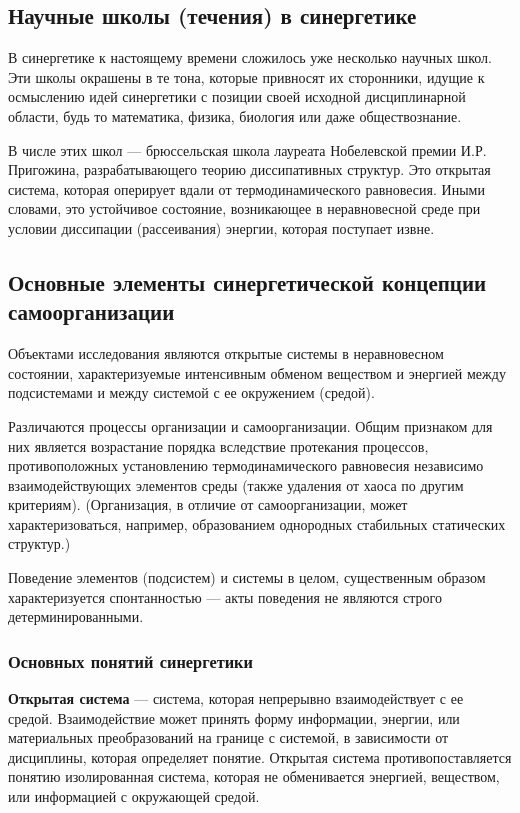 \subsection{Научные школы (течения) в синергетике}

В синергетике к настоящему времени сложилось уже несколько научных школ. Эти школы окрашены в те тона, которые привносят их сторонники, идущие к осмыслению идей синергетики с позиции своей исходной дисциплинарной области, будь то математика, физика, биология или даже обществознание.

В числе этих школ --- брюссельская школа лауреата Нобелевской премии И.Р. Пригожина, разрабатывающего теорию диссипативных структур. Это открытая система, которая оперирует вдали от термодинамического равновесия. Иными словами, это устойчивое состояние, возникающее в неравновесной среде при условии диссипации (рассеивания) энергии, которая поступает извне.

\subsection{Основные элементы синергетической концепции самоорганизации}

Объектами исследования являются открытые системы в неравновесном состоянии, характеризуемые интенсивным обменом веществом и энергией между подсистемами и между системой с ее окружением (средой).

Различаются процессы организации и самоорганизации. Общим признаком для них является возрастание порядка вследствие протекания процессов, противоположных установлению термодинамического равновесия независимо взаимодействующих элементов среды (также удаления от хаоса по другим критериям). (Организация, в отличие от самоорганизации, может характеризоваться, например, образованием однородных стабильных статических структур.)

Поведение элементов (подсистем) и системы в целом, существенным образом характеризуется спонтанностью --- акты поведения не являются строго детерминированными.

\subsubsection{Основных понятий синергетики}

\textbf{Открытая система} --- система, которая непрерывно взаимодействует с ее средой. Взаимодействие может принять форму информации, энергии, или материальных преобразований на границе с системой, в зависимости от дисциплины, которая определяет понятие. Открытая система противопоставляется понятию изолированная система, которая не обменивается энергией, веществом, или информацией с окружающей средой.

